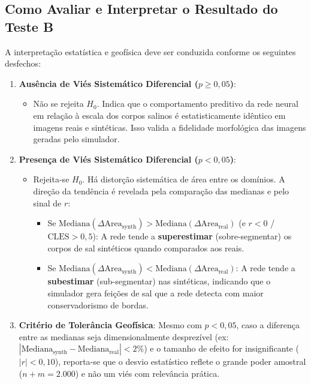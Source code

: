 \documentclass[11pt,a4paper]{article}
\begin{document}
\subsection{Como Avaliar e Interpretar o Resultado do Teste B}
A interpretação estatística e geofísica deve ser conduzida conforme os seguintes desfechos:
\begin{enumerate}
    \item \textbf{Ausência de Viés Sistemático Diferencial ($p \ge 0{,}05$)}:
    \begin{itemize}
        \item Não se rejeita $H_0$. Indica que o comportamento preditivo da rede neural em relação à escala dos corpos salinos é estatisticamente idêntico em imagens reais e sintéticas. Isso valida a fidelidade morfológica das imagens geradas pelo simulador.
    \end{itemize}
    \item \textbf{Presença de Viés Sistemático Diferencial ($p < 0{,}05$)}:
    \begin{itemize}
        \item Rejeita-se $H_0$. Há distorção sistemática de área entre os domínios. A direção da tendência é revelada pela comparação das medianas e pelo sinal de $r$:
        \begin{itemize}
            \item Se $\text{Mediana}(\Delta\text{Area}_{\text{synth}}) > \text{Mediana}(\Delta\text{Area}_{\text{real}})$ (e $r < 0$ / $\text{CLES} > 0{,}5$): A rede tende a \textbf{superestimar} (sobre-segmentar) os corpos de sal sintéticos quando comparados aos reais.
            \item Se $\text{Mediana}(\Delta\text{Area}_{\text{synth}}) < \text{Mediana}(\Delta\text{Area}_{\text{real}})$: A rede tende a \textbf{subestimar} (sub-segmentar) nas sintéticas, indicando que o simulador gera feições de sal que a rede detecta com maior conservadorismo de bordas.
        \end{itemize}
    \end{itemize}
    \item \textbf{Critério de Tolerância Geofísica}:
    Mesmo com $p < 0{,}05$, caso a diferença entre as medianas seja dimensionalmente desprezível (ex: $|\text{Mediana}_{\text{synth}} - \text{Mediana}_{\text{real}}| < 2\%$) e o tamanho de efeito for insignificante ($|r| < 0{,}10$), reporta-se que o desvio estatístico reflete o grande poder amostral ($n+m=2.000$) e não um viés com relevância prática.
\end{enumerate}
\end{document}
